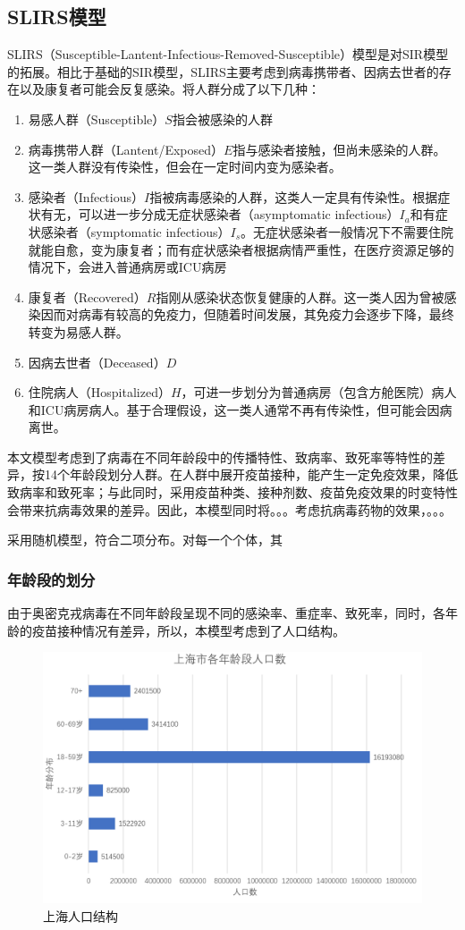 \documentclass[bwprint]{gmcmthesis}
\numberwithin{figure}{section}
\begin{document}
\subsection{SLIRS模型}
SLIRS（Susceptible-Lantent-Infectious-Removed-Susceptible）模型是对SIR模型的拓展。相比于基础的SIR模型，SLIRS主要考虑到病毒携带者、因病去世者的存在以及康复者可能会反复感染。将人群分成了以下几种：
\begin{enumerate}
\item 易感人群（Susceptible）$S$指会被感染的人群
\item 病毒携带人群（Lantent/Exposed）$E$指与感染者接触，但尚未感染的人群。这一类人群没有传染性，但会在一定时间内变为感染者。
\item 感染者（Infectious）$I$指被病毒感染的人群，这类人一定具有传染性。根据症状有无，可以进一步分成无症状感染者（asymptomatic infectious）$I_a$和有症状感染者（symptomatic infectious）$I_s$。无症状感染者一般情况下不需要住院就能自愈，变为康复者；而有症状感染者根据病情严重性，在医疗资源足够的情况下，会进入普通病房或ICU病房
\item 康复者（Recovered）$R$指刚从感染状态恢复健康的人群。这一类人因为曾被感染因而对病毒有较高的免疫力，但随着时间发展，其免疫力会逐步下降，最终转变为易感人群。
\item 因病去世者（Deceased）$D$
\item 住院病人（Hospitalized）$H$，可进一步划分为普通病房（包含方舱医院）病人和ICU病房病人。基于合理假设，这一类人通常不再有传染性，但可能会因病离世。


\end{enumerate}

\par 本文模型考虑到了病毒在不同年龄段中的传播特性、致病率、致死率等特性的差异，按14个年龄段划分人群。在人群中展开疫苗接种，能产生一定免疫效果，降低致病率和致死率；与此同时，采用疫苗种类、接种剂数、疫苗免疫效果的时变特性会带来抗病毒效果的差异。因此，本模型同时将。。。考虑抗病毒药物的效果，。。。
\par 采用随机模型，符合二项分布。对每一个个体，其
\subsubsection{年龄段的划分}
由于奥密克戎病毒在不同年龄段呈现不同的感染率、重症率、致死率，同时，各年龄的疫苗接种情况有差异，所以，本模型考虑到了人口结构。
\begin{figure}[!h]
\centering
\includegraphics[width=.75\textwidth]{renkou.png}
\caption{上海人口结构}
\label{renkou}
\end{figure}
\end{document}
